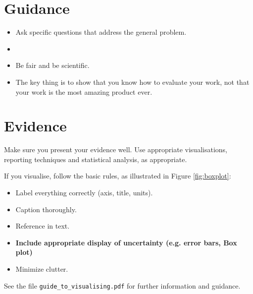 \documentclass{l4proj}
\begin{document}
\section{Guidance}
\begin{itemize}
    \item
        Ask specific questions that address the general problem.
    \item
    \item
        Be fair and be scientific.
    \item
        The key thing is to show that you know how to evaluate your work, not
        that your work is the most amazing product ever.
\end{itemize}

\section{Evidence}
Make sure you present your evidence well. Use appropriate visualisations, reporting techniques and statistical analysis, as appropriate.

If you visualise, follow the basic rules, as illustrated in Figure \ref{fig:boxplot}:
\begin{itemize}
\item Label everything correctly (axis, title, units).
\item Caption thoroughly.
\item Reference in text.
\item \textbf{Include appropriate display of uncertainty (e.g. error bars, Box plot)}
\item Minimize clutter.
\end{itemize}

See the file \texttt{guide\_to\_visualising.pdf} for further information and guidance.
\end{document}
